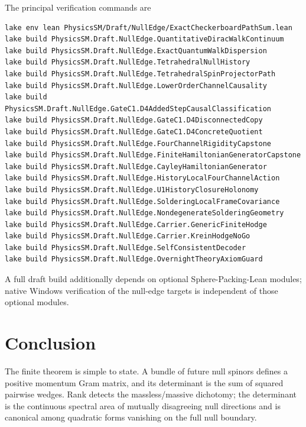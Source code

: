 \documentclass[11pt]{article}
\begin{document}
The principal verification commands are
\begin{verbatim}
lake env lean PhysicsSM/Draft/NullEdge/ExactCheckerboardPathSum.lean
lake build PhysicsSM.Draft.NullEdge.QuantitativeDiracWalkContinuum
lake build PhysicsSM.Draft.NullEdge.ExactQuantumWalkDispersion
lake build PhysicsSM.Draft.NullEdge.TetrahedralNullHistory
lake build PhysicsSM.Draft.NullEdge.TetrahedralSpinProjectorPath
lake build PhysicsSM.Draft.NullEdge.LowerOrderChannelCausality
lake build PhysicsSM.Draft.NullEdge.GateC1.D4AddedStepCausalClassification
lake build PhysicsSM.Draft.NullEdge.GateC1.D4DisconnectedCopy
lake build PhysicsSM.Draft.NullEdge.GateC1.D4ConcreteQuotient
lake build PhysicsSM.Draft.NullEdge.FourChannelRigidityCapstone
lake build PhysicsSM.Draft.NullEdge.FiniteHamiltonianGeneratorCapstone
lake build PhysicsSM.Draft.NullEdge.CayleyHamiltonianGenerator
lake build PhysicsSM.Draft.NullEdge.HistoryLocalFourChannelAction
lake build PhysicsSM.Draft.NullEdge.U1HistoryClosureHolonomy
lake build PhysicsSM.Draft.NullEdge.SolderingLocalFrameCovariance
lake build PhysicsSM.Draft.NullEdge.NondegenerateSolderingGeometry
lake build PhysicsSM.Draft.NullEdge.Carrier.GenericFiniteHodge
lake build PhysicsSM.Draft.NullEdge.Carrier.KreinHodgeNoGo
lake build PhysicsSM.Draft.NullEdge.SelfConsistentDecoder
lake build PhysicsSM.Draft.NullEdge.OvernightTheoryAxiomGuard
\end{verbatim}
A full draft build additionally depends on optional Sphere-Packing-Lean modules;
native Windows verification of the null-edge targets is independent of those
optional modules.

\section{Conclusion}

The finite theorem is simple to state.  A bundle of future null spinors defines
a positive momentum Gram matrix, and its determinant is the sum of squared
pairwise wedges.  Rank detects the massless/massive dichotomy; the determinant
is the continuous spectral area of mutually disagreeing null directions and is
canonical among quadratic forms vanishing on the full null boundary.
\end{document}
